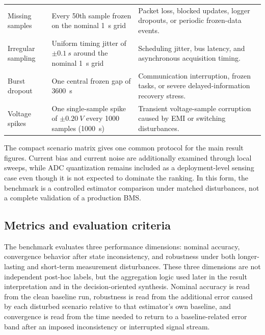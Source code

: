 \documentclass[
    a4paper,
    12pt,
    titlepage,
    bibliography=totoc,
    twoside=on,
    parskip=false,
    numbers=noenddot,
    cleardoublepage=empty,
    DIV=12,
    BCOR=12.0mm,
    headheight=36pt,
    headings=openright
]{scrreprt}
\begin{document}
\begin{table}[H]
\begin{tabularx}{\textwidth}{>{\raggedright\arraybackslash}p{2.6cm}>{\raggedright\arraybackslash}X>{\raggedright\arraybackslash}X}
        Missing samples & Every 50th sample frozen on the nominal \SI{1}{s} grid & Packet loss, blocked updates, logger dropouts, or periodic frozen-data events.\autocite{naseriReliableWirelessBMS2025,liuAssessingImpactSampling2025} \\
        Irregular sampling & Uniform timing jitter of $\pm\SI{0.1}{s}$ around the nominal \SI{1}{s} grid & Scheduling jitter, bus latency, and asynchronous acquisition timing.\autocite{bergerBenchmarkingBatteryManagement2024,naseriReliableWirelessBMS2025,liuAssessingImpactSampling2025} \\
        Burst dropout & One central frozen gap of \SI{3600}{s} & Communication interruption, frozen tasks, or severe delayed-information recovery stress.\autocite{bergerBenchmarkingBatteryManagement2024,naseriReliableWirelessBMS2025} \\
        Voltage spikes & One single-sample spike of $\pm\SI{0.20}{V}$ every 1000 samples (\SI{1000}{s}) & Transient voltage-sample corruption caused by EMI or switching disturbances.\autocite{aielloElectromagneticSusceptibilityBattery2020} \\
        \bottomrule
    \end{tabularx}
\end{table}

The compact scenario matrix gives one common protocol for the main result figures. Current bias and current noise are additionally examined through local sweeps, while ADC quantization remains included as a deployment-level sensing case even though it is not expected to dominate the ranking. In this form, the benchmark is a controlled estimator comparison under matched disturbances, not a complete validation of a production BMS.

\subsection{Metrics and evaluation criteria}
\label{sec:robustness_metrics}
The benchmark evaluates three performance dimensions: nominal accuracy, convergence behavior after state inconsistency, and robustness under both longer-lasting and short-term measurement disturbances. These three dimensions are not independent post-hoc labels, but the aggregation logic used later in the result interpretation and in the decision-oriented synthesis. Nominal accuracy is read from the clean baseline run, robustness is read from the additional error caused by each disturbed scenario relative to that estimator's own baseline, and convergence is read from the time needed to return to a baseline-related error band after an imposed inconsistency or interrupted signal stream.
\end{document}
